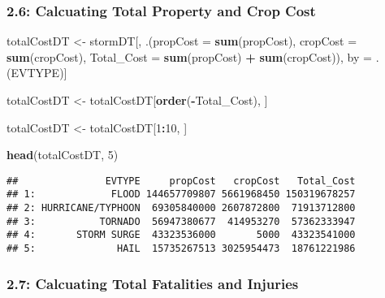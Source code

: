 \documentclass[
]{article}
\newenvironment{Shaded}{\begin{snugshade}}{\end{snugshade}}
\newcommand{\DataTypeTok}[1]{\textcolor[rgb]{0.13,0.29,0.53}{#1}}
\newcommand{\DecValTok}[1]{\textcolor[rgb]{0.00,0.00,0.81}{#1}}
\newcommand{\KeywordTok}[1]{\textcolor[rgb]{0.13,0.29,0.53}{\textbf{#1}}}
\newcommand{\NormalTok}[1]{#1}
\newcommand{\OperatorTok}[1]{\textcolor[rgb]{0.81,0.36,0.00}{\textbf{#1}}}
\newcommand{\StringTok}[1]{\textcolor[rgb]{0.31,0.60,0.02}{#1}}
\begin{document}
\hypertarget{calcuating-total-property-and-crop-cost}{%
\subsubsection{2.6: Calcuating Total Property and Crop
Cost}\label{calcuating-total-property-and-crop-cost}}

\begin{Shaded}
\begin{Highlighting}[]
\NormalTok{totalCostDT <-}\StringTok{ }\NormalTok{stormDT[, .(}\DataTypeTok{propCost =} \KeywordTok{sum}\NormalTok{(propCost), }\DataTypeTok{cropCost =} \KeywordTok{sum}\NormalTok{(cropCost), }\DataTypeTok{Total_Cost =} \KeywordTok{sum}\NormalTok{(propCost) }\OperatorTok{+}\StringTok{ }\KeywordTok{sum}\NormalTok{(cropCost)), by =}\StringTok{ }\NormalTok{.(EVTYPE)]}

\NormalTok{totalCostDT <-}\StringTok{ }\NormalTok{totalCostDT[}\KeywordTok{order}\NormalTok{(}\OperatorTok{-}\NormalTok{Total_Cost), ]}

\NormalTok{totalCostDT <-}\StringTok{ }\NormalTok{totalCostDT[}\DecValTok{1}\OperatorTok{:}\DecValTok{10}\NormalTok{, ]}

\KeywordTok{head}\NormalTok{(totalCostDT, }\DecValTok{5}\NormalTok{)}
\end{Highlighting}
\end{Shaded}

\begin{verbatim}
##               EVTYPE     propCost   cropCost   Total_Cost
## 1:             FLOOD 144657709807 5661968450 150319678257
## 2: HURRICANE/TYPHOON  69305840000 2607872800  71913712800
## 3:           TORNADO  56947380677  414953270  57362333947
## 4:       STORM SURGE  43323536000       5000  43323541000
## 5:              HAIL  15735267513 3025954473  18761221986
\end{verbatim}

\hypertarget{calcuating-total-fatalities-and-injuries}{%
\subsubsection{2.7: Calcuating Total Fatalities and
Injuries}\label{calcuating-total-fatalities-and-injuries}}
\end{document}
